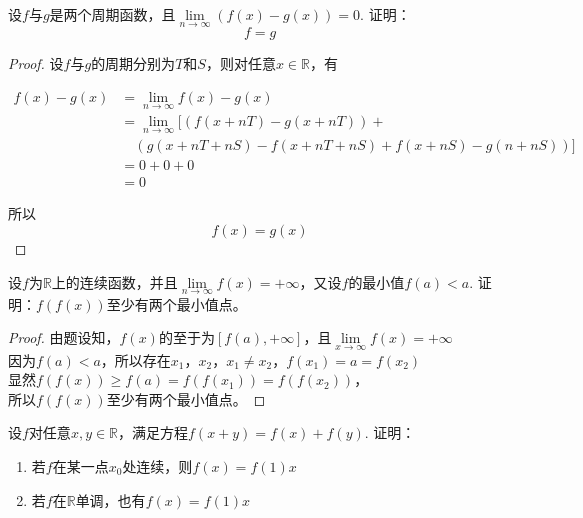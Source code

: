 \begin{proposition}
    
    设$f$与$g$是两个周期函数，且$\lim\limits_{n \to \infty}{(f(x) - g(x))} =  0$.
    证明：
    $$f = g $$

\end{proposition}

\begin{proof}
    
    设$f$与$g$的周期分别为$T$和$S$，则对任意$x \in \mathbb{R}$，有
    
    \begin{align*}
        f(x) - g(x) & = \lim\limits_{n \to \infty}{f(x) - g(x)} \\
        & = \lim\limits_{n \to \infty}[(f(x + nT) - g(x + nT)) + \\
        & \quad(g(x + nT + nS) - f(x + nT + nS) + f(x + nS) - g(n + nS))] \\
        & = 0 + 0 + 0 \\
        & = 0
    \end{align*}

    所以
    $$f(x) = g(x)$$

\end{proof}

\begin{proposition}
    
    设$f$为$\mathbb{R}$上的连续函数，并且$\lim\limits_{n \to \infty}{f(x)} = +\infty$，又设$f$的最小值$f(a) < a$.
    证明：$f(f(x))$至少有两个最小值点。

\end{proposition}

\begin{proof}
    
    由题设知，$f(x)$的至于为$[f(a), +\infty]$，且$\lim\limits_{x \to \infty}{f(x)} = +\infty$ \\
    因为$f(a) < a$，所以存在$x_1$，$x_2$，$x_1 \neq x_2$，$f(x_1) = a = f(x_2)$ \\
    显然$f(f(x)) \geq f(a) = f(f(x_1)) = f(f(x_2))$，\\
    所以$f(f(x))$至少有两个最小值点。

\end{proof}

\begin{proposition}[Cauthy方程]
    
    设$f$对任意$x, y \in \mathbb{R}$，满足方程$f(x + y) = f(x) + f(y)$. 证明：

    \begin{enumerate}

        \item 若$f$在某一点$x_0$处连续，则$f(x) = f(1)x$
        
        \item 若$f$在$\mathbb{R}$单调，也有$f(x) = f(1)x$
        
    \end{enumerate}

\end{proposition}


